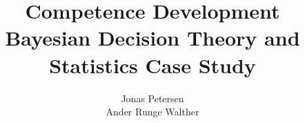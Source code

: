 \documentclass[a4paper,11pt, oneside]{article}
\theoremstyle{definition}
\begin{document}
	
	
	\begin{titlepage}
		\title{\small{Competence Development}\\
			\huge{Bayesian Decision Theory and Statistics Case Study}
		}
		\author{Jonas Petersen \\ Ander Runge Walther }
		\date{} %
		\maketitle
		\thispagestyle{empty}
	\end{titlepage}
	\newpage
	\begin{versionhistory}
	\end{versionhistory}
	
	
	\tableofcontents
	
	\thispagestyle{plain}
	
	
	
	
	
	
	
	
	
%
	
	
	
	
\end{document}
